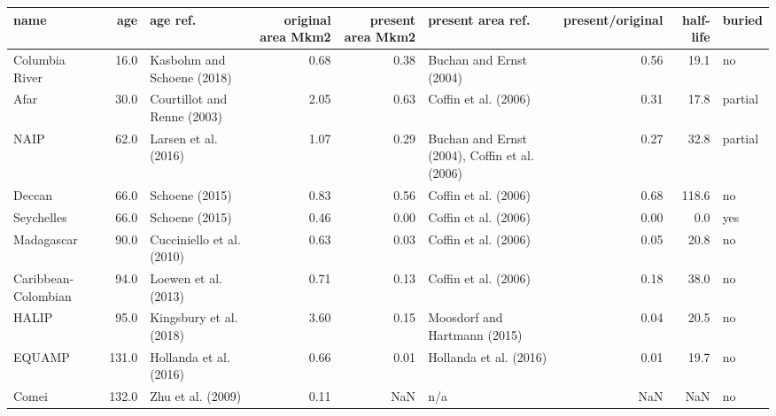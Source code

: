 \begin{tabular}{lrlrrlrrl}
\toprule
                name &    age &                     age ref. &  original area Mkm2 &  present area Mkm2 &                                 present area ref. &  present/original &  half-life &   buried \\
\midrule
      Columbia River &   16.0 &   Kasbohm and Schoene (2018) &                0.68 &               0.38 &                           Buchan and Ernst (2004) &              0.56 &       19.1 &       no \\
                Afar &   30.0 &  Courtillot and Renne (2003) &                2.05 &               0.63 &                              Coffin et al. (2006) &              0.31 &       17.8 &  partial \\
                NAIP &   62.0 &         Larsen et al. (2016) &                1.07 &               0.29 &     Buchan and Ernst (2004), Coffin et al. (2006) &              0.27 &       32.8 &  partial \\
              Deccan &   66.0 &               Schoene (2015) &                0.83 &               0.56 &                              Coffin et al. (2006) &              0.68 &      118.6 &       no \\
          Seychelles &   66.0 &               Schoene (2015) &                0.46 &               0.00 &                              Coffin et al. (2006) &              0.00 &        0.0 &      yes \\
          Madagascar &   90.0 &    Cucciniello et al. (2010) &                0.63 &               0.03 &                              Coffin et al. (2006) &              0.05 &       20.8 &       no \\
 Caribbean-Colombian &   94.0 &         Loewen et al. (2013) &                0.71 &               0.13 &                              Coffin et al. (2006) &              0.18 &       38.0 &       no \\
               HALIP &   95.0 &      Kingsbury et al. (2018) &                3.60 &               0.15 &                      Moosdorf and Hartmann (2015) &              0.04 &       20.5 &       no \\
              EQUAMP &  131.0 &       Hollanda et al. (2016) &                0.66 &               0.01 &                            Hollanda et al. (2016) &              0.01 &       19.7 &       no \\
               Comei &  132.0 &            Zhu et al. (2009) &                0.11 &                NaN &                                               n/a &               NaN &        NaN &       no \\

\end{tabular}
